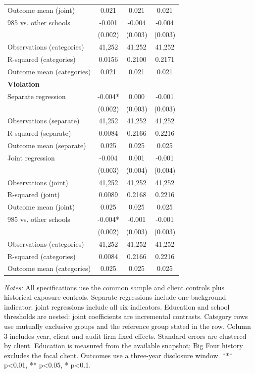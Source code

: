 \begin{table}[htbp]
\begin{threeparttable}
\begin{tabular}{p{}ccc}
Outcome mean (joint) & 0.021 & 0.021 & 0.021 \\
985 vs. other schools & -0.001 & -0.004 & -0.004 \\
 & (0.002) & (0.003) & (0.003) \\
Observations (categories) & 41,252 & 41,252 & 41,252 \\
R-squared (categories) & 0.0156 & 0.2100 & 0.2171 \\
Outcome mean (categories) & 0.021 & 0.021 & 0.021 \\
\multicolumn{4}{l}{\textbf{Violation}} \\
Separate regression & -0.004* & 0.000 & -0.001 \\
 & (0.002) & (0.003) & (0.003) \\
Observations (separate) & 41,252 & 41,252 & 41,252 \\
R-squared (separate) & 0.0084 & 0.2166 & 0.2216 \\
Outcome mean (separate) & 0.025 & 0.025 & 0.025 \\
Joint regression & -0.004 & 0.001 & -0.001 \\
 & (0.003) & (0.004) & (0.004) \\
Observations (joint) & 41,252 & 41,252 & 41,252 \\
R-squared (joint) & 0.0089 & 0.2168 & 0.2216 \\
Outcome mean (joint) & 0.025 & 0.025 & 0.025 \\
985 vs. other schools & -0.004* & -0.001 & -0.001 \\
 & (0.002) & (0.003) & (0.003) \\
Observations (categories) & 41,252 & 41,252 & 41,252 \\
R-squared (categories) & 0.0084 & 0.2166 & 0.2216 \\
Outcome mean (categories) & 0.025 & 0.025 & 0.025 \\
\bottomrule
\end{tabular}
\begin{tablenotes}\footnotesize
\item \raggedright \textit{Notes:} All specifications use the common sample and client controls plus historical exposure controls. Separate regressions include one background indicator; joint regressions include all six indicators. Education and school thresholds are nested: joint coefficients are incremental contrasts. Category rows use mutually exclusive groups and the reference group stated in the row. Column 3 includes year, client and audit firm fixed effects. Standard errors are clustered by client. Education is measured from the available snapshot; Big Four history excludes the focal client. Outcomes use a three-year disclosure window. *** p<0.01, ** p<0.05, * p<0.1.
\end{tablenotes}
\end{threeparttable}
\end{table}
